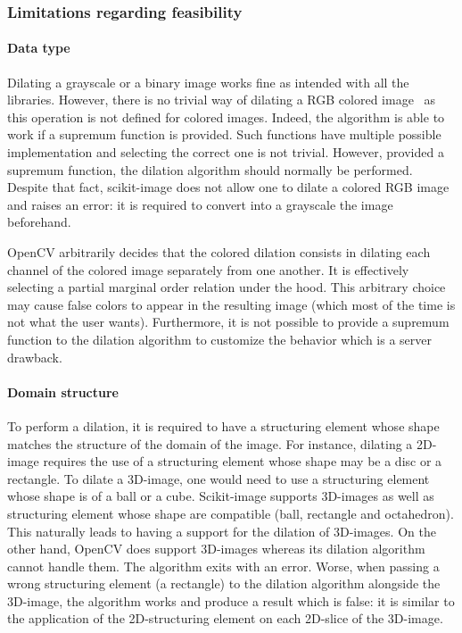 \subsubsection{Limitations regarding feasibility}

\paragraph{Data type} Dilating a grayscale or a binary image works fine as intended with all the libraries. However,
there is no trivial way of dilating a RGB colored image~\parencite{angulo.2007.morpho_color,dewitte.2005.morpho_color}
as this operation is not defined for colored images. Indeed, the algorithm is able to work if a supremum function is
provided. Such functions have multiple possible implementation and selecting the correct one is not trivial. However,
provided a supremum function, the dilation algorithm should normally be performed. Despite that fact, scikit-image does
not allow one to dilate a colored RGB image and raises an error: it is required to convert into a grayscale the image
beforehand.

OpenCV arbitrarily decides that the colored dilation consists in dilating each channel of the colored image separately
from one another. It is effectively selecting a partial marginal order relation under the hood. This arbitrary choice
may cause false colors to appear in the resulting image (which most of the time is not what the user wants).
Furthermore, it is not possible to provide a supremum function to the dilation algorithm to customize the behavior which
is a server drawback.

\paragraph{Domain structure} To perform a dilation, it is required to have a structuring element whose shape matches the
structure of the domain of the image. For instance, dilating a 2D-image requires the use of a structuring element whose
shape may be a disc or a rectangle. To dilate a 3D-image, one would need to use a structuring element whose shape is of
a ball or a cube. Scikit-image supports 3D-images as well as structuring element whose shape are compatible (ball,
rectangle and octahedron). This naturally leads to having a support for the dilation of 3D-images. On the other hand,
OpenCV does support 3D-images whereas its dilation algorithm cannot handle them. The algorithm exits with an error.
Worse, when passing a wrong structuring element (a rectangle) to the dilation algorithm alongside the 3D-image, the
algorithm works and produce a result which is false: it is similar to the application of the 2D-structuring element on
each 2D-slice of the 3D-image.


